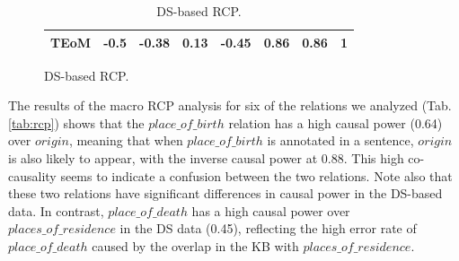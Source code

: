 \begin{table}[htb!]
\begin{subfigure}{\textwidth}
{\begin{tabular}{rccccccc}
     TEoM & -0.5  & -0.38 & 0.13  & -0.45 & 0.86  & \textbf{0.86}  & 1 \\ %
     \bottomrule
    \end{tabular}
    }
\end{subfigure}
\begin{subfigure}{\textwidth}
	\caption{DS-based RCP.}
    \label{tab:ds_rcp}
    \centering
\end{subfigure}
\end{table}

The results of the macro RCP analysis for six of the relations we analyzed (Tab.\ref{tab:rcp}) shows that the $place\_of\_birth$ relation has a high causal power (0.64) over $origin$, meaning that when $place\_of\_birth$ is annotated in a sentence, $origin$ is also likely to appear, with the inverse causal power at 0.88.  This high co-causality seems to indicate a confusion between the two relations. Note also that these two relations have significant differences in causal power in the DS-based data. In contrast, $place\_of\_death$ has a high causal power over $places\_of\_residence$ in the DS data (0.45), reflecting the high error rate of $place\_of\_death$ caused by the overlap in the KB with $places\_of\_residence$.


